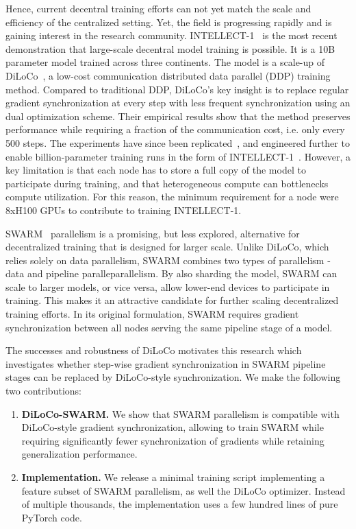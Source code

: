 \documentclass{article}
\begin{document}
Hence, current decentral training efforts can not yet match the scale and
efficiency of the centralized setting. Yet, the field is progressing rapidly and
is gaining interest in the research community. INTELLECT-1~\cite{intellect1} is
the most recent demonstration that large-scale decentral model training is
possible. It is a 10B parameter model trained across three continents. The model
is a scale-up of DiLoCo~\cite{douillard2023}, a low-cost communication
distributed data parallel (DDP) training method. Compared to traditional DDP,
DiLoCo's key insight is to replace regular gradient synchronization at every
step with less frequent synchronization using an dual optimization scheme. Their
empirical results show that the method preserves performance while requiring a
fraction of the communication cost, i.e. only every 500 steps. The experiments
have since been replicated~\cite{jaghouar2024}, and engineered further to enable
billion-parameter training runs in the form of INTELLECT-1~\cite{intellect1}.
However, a key limitation is that each node has to store a full copy of the
model to participate during training, and that heterogeneous compute can
bottlenecks compute utilization. For this reason, the minimum requirement for a
node were 8xH100 GPUs to contribute to training INTELLECT-1.

SWARM~\cite{ryabinin2023} parallelism is a promising, but less explored,
alternative for decentralized training that is designed for larger scale. Unlike
DiLoCo, which relies solely on data parallelism, SWARM combines two types of 
parallelism - data and pipeline paralleparallelism. By also sharding the model,
SWARM can scale to larger models, or vice versa, allow lower-end devices to
participate in training. This makes it an attractive candidate for further
scaling decentralized training efforts. In its original formulation, SWARM
requires gradient synchronization between all nodes serving the same pipeline
stage of a model. 

The successes and robustness of DiLoCo motivates this research which investigates
whether step-wise gradient synchronization in SWARM pipeline stages can be replaced
by DiLoCo-style synchronization. We make the following two contributions:

\begin{enumerate}
  \item \textbf{DiLoCo-SWARM.} We show that SWARM parallelism is compatible with
  DiLoCo-style gradient synchronization, allowing to train SWARM while requiring
  significantly fewer synchronization of gradients while retaining
  generalization performance.
  \item \textbf{Implementation.} We release a minimal training script
  implementing a feature subset of SWARM parallelism, as well the DiLoCo
  optimizer.  Instead of multiple thousands, the implementation uses a few
  hundred lines of pure PyTorch code.
\end{enumerate}
\end{document}
